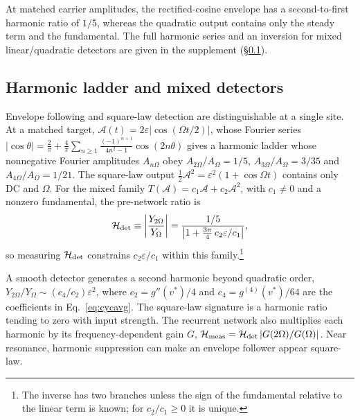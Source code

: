 \documentclass[11pt,a4paper]{article}
\newif\ifjne
\newcommand{\half}{\tfrac{1}{2}}
\begin{document}
At matched carrier amplitudes, the rectified-cosine envelope has a
second-to-first harmonic ratio of $1/5$, whereas the quadratic output contains
only the steady term and the fundamental. The full harmonic series and an
inversion for mixed linear/quadratic detectors are given in the supplement
(\S\ref{supp:harmonics}).
\ifjne\else
\subsection{Harmonic ladder and mixed detectors}\label{supp:harmonics}
Envelope following and square-law detection are distinguishable at a single site. At a matched target,
$\mathcal A(t)=2\varepsilon|\cos(\Omega t/2)|$, whose Fourier series
$|\cos\theta|=\tfrac2\pi+\tfrac4\pi\sum_{n\ge1}\tfrac{(-1)^{n+1}}{4n^2-1}\cos(2n\theta)$ gives a
harmonic ladder whose nonnegative Fourier amplitudes $A_{n\Omega}$ obey $A_{2\Omega}/A_\Omega=1/5$, $A_{3\Omega}/A_\Omega=3/35$ and
$A_{4\Omega}/A_\Omega=1/21$. The square-law output $\half \mathcal A^2=\varepsilon^2(1+\cos\Omega
t)$ contains only DC and $\Omega$. For the mixed family $T(\mathcal A)=c_1\mathcal A+c_2\mathcal A^2$, with
$c_1\ne0$ and a nonzero fundamental, the
pre-network ratio is
\begin{equation}
\mathcal H_{\rm det}\equiv\left|\frac{Y_{2\Omega}}{Y_\Omega}\right|
=\frac{1/5}{\left|1+\tfrac{3\pi}{4}\,c_2\varepsilon/c_1\right|},
\label{eq:rdet}
\end{equation}
so measuring $\mathcal H_{\rm det}$ constrains $c_2\varepsilon/c_1$ within this family.\footnote{The inverse has two branches unless the sign of the fundamental
relative to the linear term is known; for $c_2/c_1\ge0$ it is unique.}

\fi

A smooth detector generates a second harmonic beyond quadratic order,
$Y_{2\Omega}/Y_\Omega\sim(c_4/c_2)\varepsilon^2$, where
$c_2=g''(v^*)/4$ and $c_4=g^{(4)}(v^*)/64$ are the coefficients in
Eq.~\eqref{eq:cycavg}. The square-law signature is a harmonic ratio tending to zero with input strength. The recurrent
network also multiplies each harmonic by its frequency-dependent gain $G$,
$\mathcal H_{\rm meas}=\mathcal H_{\rm det}\,|G(2\Omega)/G(\Omega)|$.
Near resonance, harmonic suppression can make an envelope follower appear square-law.
\end{document}
